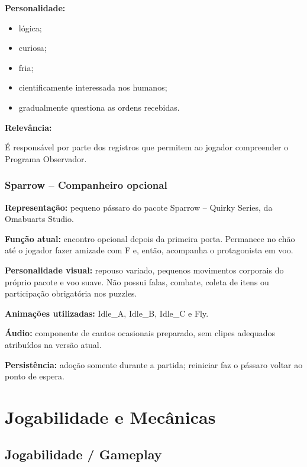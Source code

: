 \documentclass[12pt,a4paper]{article}
\begin{document}
\textbf{Personalidade:}

\begin{itemize}
    \item lógica;
    \item curiosa;
    \item fria;
    \item cientificamente interessada nos humanos;
    \item gradualmente questiona as ordens recebidas.
\end{itemize}

\textbf{Relevância:}

É responsável por parte dos registros que permitem ao jogador
compreender o Programa Observador.


\subsubsection*{Sparrow -- Companheiro opcional}

\textbf{Representação:} pequeno pássaro do pacote Sparrow --
Quirky Series, da Omabuarts Studio.

\textbf{Função atual:} encontro opcional depois da primeira porta.
Permanece no chão até o jogador fazer amizade com F e, então,
acompanha o protagonista em voo.

\textbf{Personalidade visual:} repouso variado, pequenos movimentos
corporais do próprio pacote e voo suave. Não possui falas,
combate, coleta de itens ou participação obrigatória nos puzzles.

\textbf{Animações utilizadas:} Idle\_A, Idle\_B, Idle\_C e Fly.

\textbf{Áudio:} componente de cantos ocasionais preparado, sem clipes
adequados atribuídos na versão atual.

\textbf{Persistência:} adoção somente durante a partida; reiniciar
faz o pássaro voltar ao ponto de espera.


\section{Jogabilidade e Mecânicas}

\subsection{Jogabilidade / Gameplay}
\end{document}
